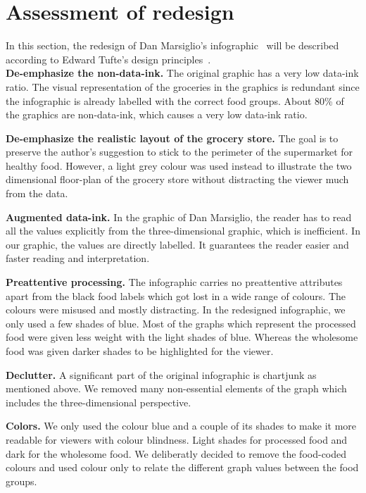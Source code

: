 \section{Assessment of redesign}

In this section, the redesign of Dan Marsiglio's
infographic~\cite{DanMarsiglio2008} will be described according to Edward
Tufte's design principles~\cite{Tufte2001}.\\

\textbf{De-emphasize the non-data-ink.} The original graphic has a very low
data-ink ratio. The visual representation of the groceries in the graphics is
redundant since the infographic is already labelled with the correct food
groups. About 80\% of the graphics are non-data-ink, which causes a very low
data-ink ratio.

\textbf{De-emphasize the realistic layout of the grocery store.} The goal is to
preserve the author's suggestion to stick to the perimeter of the supermarket
for healthy food. However, a light grey colour was used instead to illustrate
the two dimensional floor-plan of the grocery store without distracting the
viewer much from the data.

\textbf{Augmented data-ink.} In the graphic of Dan Marsiglio, the reader has to
read all the values explicitly from the three-dimensional graphic, which is
inefficient. In our graphic, the values are directly labelled. It guarantees the
reader easier and faster reading and interpretation.

\textbf{Preattentive processing.} The infographic carries no preattentive
attributes apart from the black food labels which got lost in a wide range of
colours. The colours were misused and mostly distracting. In the redesigned
infographic, we only used a few shades of blue. Most of the graphs which
represent the processed food were given less weight with the light shades of
blue. Whereas the wholesome food was given darker shades to be highlighted for
the viewer.

\textbf{Declutter.} A significant part of the original infographic is chartjunk
as mentioned above. We removed many non-essential elements of the graph which
includes the three-dimensional perspective. 

\textbf{Colors.} We only used the colour blue and a couple of its shades to make
it more readable for viewers with colour blindness. Light shades for processed
food and dark for the wholesome food. We deliberatly decided to remove the
food-coded colours and used colour only to relate the different graph values
between the food groups.\\

